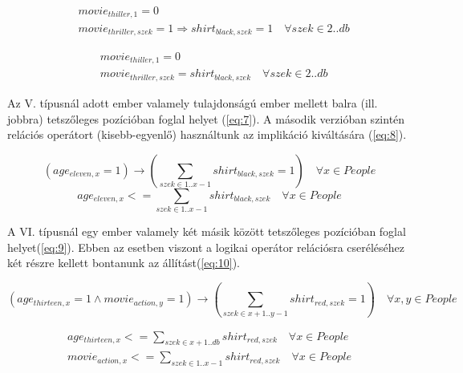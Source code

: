 \documentclass[12pt,a4paper,twoside, openright]{report}
\begin{document}
    \begin{equation} \label{eq:5}
    \begin{aligned}
    &movie_{thiller,1}=0 \\
    &movie_{thriller,szek}=1 \Rightarrow shirt_{black,szek}=1 \quad \forall szek \in 2..db
    \end{aligned}
    \end{equation}
    
    \begin{equation} \label{eq:6}
    \begin{aligned}
    &movie_{thiller,1}=0 \\
    &movie_{thriller,szek}= shirt_{black,szek} \quad \forall szek\in 2..db
    \end{aligned}
    \end{equation}

    Az V. típusnál adott ember valamely tulajdonságú ember mellett balra (ill. jobbra) tetszőleges pozícióban foglal helyet (\ref{eq:7}).
    A második verzióban szintén relációs operátort (kisebb-egyenlő) használtunk az implikáció kiváltására (\ref{eq:8}).

    \begin{equation} \label{eq:7}
    (age_{eleven,x}=1) \rightarrow (\sum_{ szek \in 1..x-1 } shirt_{black,szek}=1) \quad \forall x \in People
    \end{equation}
    \begin{equation} \label{eq:8}
    age_{eleven,x} <= \sum_{szek \in 1..x-1} shirt_{black,szek} \quad \forall x \in People
     \end{equation}

    A VI. típusnál egy ember valamely két másik között tetszőleges pozícióban foglal helyet(\ref{eq:9}).
    Ebben az esetben viszont a logikai operátor relációsra cseréléséhez két részre kellett bontanunk az állítást(\ref{eq:10}).

   \begin{equation} \label{eq:9}
    (age_{thirteen,x}=1 \wedge movie_{action,y}=1) \rightarrow (\sum_{szek\in x+1..y-1} shirt_{red,szek}=1) \quad\forall x,y \in People
   \end{equation} 
    
   \begin{equation} \label{eq:10}
   \begin{aligned}
   age_{thirteen,x} <= \sum_{szek\in x+1..db} shirt_{red,szek} \quad \forall x \in People \\
   movie_{action,x} <= \sum_{szek\in 1..x-1} shirt_{red,szek} \quad \forall x \in People
   \end{aligned}
   \end{equation}
\end{document}
